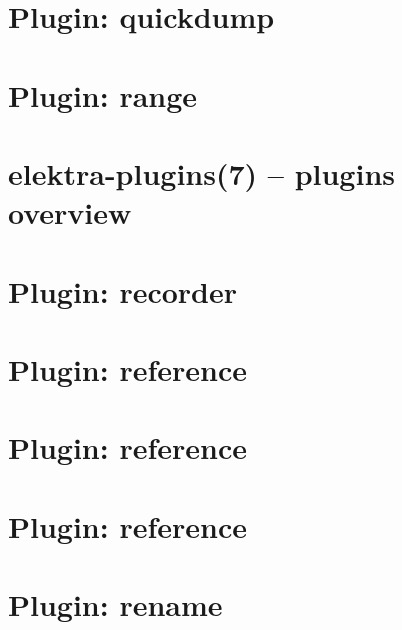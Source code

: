 \let\mypdfximage\pdfximage\def\pdfximage{\immediate\mypdfximage}\documentclass[twoside]{book}
\newcommand{\+}{\discretionary{\mbox{\scriptsize$\hookleftarrow$}}{}{}}
\begin{document}
\chapter{Plugin\+: quickdump}
\label{md_src_plugins_quickdump_README}

\chapter{Plugin\+: range}
\label{md_src_plugins_range_README}

\chapter{elektra-\/plugins(7) -- plugins overview}
\label{src_plugins_README_md}

\chapter{Plugin\+: recorder}
\label{md_src_plugins_recorder_README}

\chapter{Plugin\+: reference}
\label{md_src_plugins_reference_examples_alternative_README}

\chapter{Plugin\+: reference}
\label{md_src_plugins_reference_examples_complex_README}

\chapter{Plugin\+: reference}
\label{md_src_plugins_reference_README}

\chapter{Plugin\+: rename}
\label{md_src_plugins_rename_README}

\end{document}
